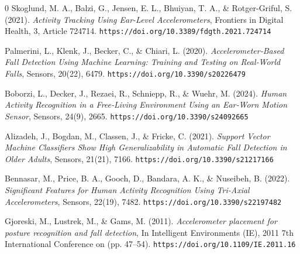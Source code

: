 \documentclass[conference]{IEEEtran}
\begin{document}
\begin{thebibliography}{0}
Skoglund, M. A., Balzi, G., Jensen, E. L., Bhuiyan, T. A., \& Rotger-Griful, S. (2021).  
{\it Activity Tracking Using Ear-Level Accelerometers},  
Frontiers in Digital Health, 3, Article 724714.  
{\tt https://doi.org/10.3389/fdgth.2021.724714}

Palmerini, L., Klenk, J., Becker, C., \& Chiari, L. (2020).  
{\it Accelerometer‑Based Fall Detection Using Machine Learning: Training and Testing on Real‑World Falls},  
Sensors, 20(22), 6479.  
{\tt https://doi.org/10.3390/s20226479}

Boborzi, L., Decker, J., Rezaei, R., Schniepp, R., \& Wuehr, M. (2024).  
{\it Human Activity Recognition in a Free‑Living Environment Using an Ear‑Worn Motion Sensor},  
Sensors, 24(9), 2665.  
{\tt https://doi.org/10.3390/s24092665}

Alizadeh, J., Bogdan, M., Classen, J., \& Fricke, C. (2021).  
{\it Support Vector Machine Classifiers Show High Generalizability in Automatic Fall Detection in Older Adults},  
Sensors, 21(21), 7166.  
{\tt https://doi.org/10.3390/s21217166}

Bennasar, M., Price, B. A., Gooch, D., Bandara, A. K., \& Nuseibeh, B. (2022).  
{\it Significant Features for Human Activity Recognition Using Tri‑Axial Accelerometers},  
Sensors, 22(19), 7482.  
{\tt https://doi.org/10.3390/s22197482}

Gjoreski, M., Lustrek, M., \& Gams, M. (2011). 
{\it Accelerometer placement for posture recognition and fall detection},
In Intelligent Environments (IE), 2011 7th International Conference on (pp. 47–54). 
{\tt https://doi.org/10.1109/IE.2011.16}




\end{thebibliography}
\end{document}

